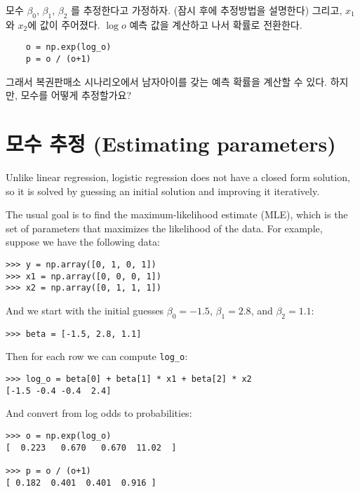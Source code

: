 모수 $\beta_0$, $\beta_1$, $\beta_2$ 를 추정한다고 가정하자.
 (잠시 후에 추정방법을 설명한다)
그리고, $x_1$와 $x_2$에 값이 주어졌다. 
$\log o$ 예측 값을 계산하고 나서 확률로 전환한다.

\begin{verbatim}
    o = np.exp(log_o)
    p = o / (o+1)
\end{verbatim}

그래서 복권판매소 시나리오에서 남자아이를 갖는 예측 확률을 계산할 수 있다. 하지만, 모수를 어떻게 추정할가요?

\section{모수 추정 (Estimating parameters)}

Unlike linear regression, logistic regression does not have a
closed form solution, so it is solved by guessing an initial
solution and improving it iteratively.

The usual goal is to find the maximum-likelihood estimate (MLE),
which is the set of parameters that maximizes the likelihood of the
data.  For example, suppose we have the following data:

\begin{verbatim}
>>> y = np.array([0, 1, 0, 1])
>>> x1 = np.array([0, 0, 0, 1])
>>> x2 = np.array([0, 1, 1, 1])
\end{verbatim}

And we start with the initial guesses $\beta_0=-1.5$, $\beta_1=2.8$,
and $\beta_2=1.1$:

\begin{verbatim}
>>> beta = [-1.5, 2.8, 1.1]
\end{verbatim}

Then for each row we can compute \verb"log_o":

\begin{verbatim}
>>> log_o = beta[0] + beta[1] * x1 + beta[2] * x2 
[-1.5 -0.4 -0.4  2.4]
\end{verbatim}

And convert from log odds to probabilities:

\begin{verbatim}
>>> o = np.exp(log_o)
[  0.223   0.670   0.670  11.02  ]

>>> p = o / (o+1)
[ 0.182  0.401  0.401  0.916 ]
\end{verbatim}


